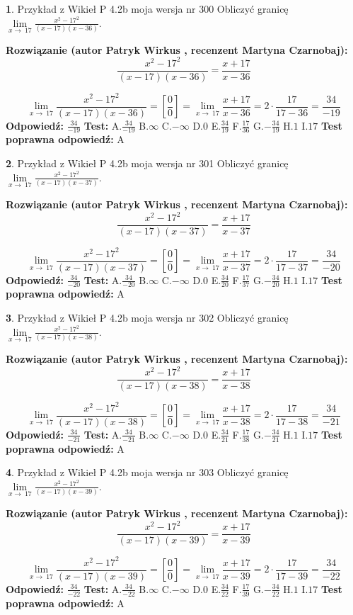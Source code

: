 \documentclass[12pt, a4paper]{article}
\theoremstyle{definition} %
\newtheorem{zad}{}
\newcommand{\zadStart}[1]{\begin{zad}#1\newline}
\newcommand{\zadStop}{\end{zad}}
\newcommand{\rozwStart}[2]{\noindent \textbf{Rozwiązanie (autor #1 , recenzent #2): }\newline}
\newcommand{\rozwStop}{\newline}
\newcommand{\odpStart}{\noindent \textbf{Odpowiedź:}\newline}
\newcommand{\odpStop}{\newline}
\newcommand{\testStart}{\noindent \textbf{Test:}\newline}
\newcommand{\testStop}{\newline}
\newcommand{\kluczStart}{\noindent \textbf{Test poprawna odpowiedź:}\newline}
\newcommand{\kluczStop}{\newline}
\begin{document}
\zadStart{Przykład z Wikieł P 4.2b moja wersja nr 300}
Obliczyć granicę $\lim\limits_{x\to\ 17}\frac{x^{2}-17^{2}}{(x-17)(x-36)}$.
\zadStop
\rozwStart{Patryk Wirkus}{Martyna Czarnobaj}
$$\frac{x^{2}-17^{2}}{(x-17)(x-36)}=\frac{x+17}{x-36}$$

$$\lim\limits_{x\to\ 17}\frac{x^{2}-17^{2}}{(x-17)(x-36)}=[\frac{0}{0}]=\lim\limits_{x\to\ 17}\frac{x+17}{x-36}=2 \cdot \frac{17}{17-36} = \frac{34}{-19}$$
\rozwStop
\odpStart
$\frac{34}{-19}$
\odpStop
\testStart
A.$\frac{34}{-19}$
B.$\infty$
C.$-\infty$
D.$0$
E.$\frac{34}{19}$
F.$\frac{17}{36}$
G.$-\frac{34}{19}$
H.$1$
I.$17$
\testStop
\kluczStart
A
\kluczStop



\zadStart{Przykład z Wikieł P 4.2b moja wersja nr 301}
Obliczyć granicę $\lim\limits_{x\to\ 17}\frac{x^{2}-17^{2}}{(x-17)(x-37)}$.
\zadStop
\rozwStart{Patryk Wirkus}{Martyna Czarnobaj}
$$\frac{x^{2}-17^{2}}{(x-17)(x-37)}=\frac{x+17}{x-37}$$

$$\lim\limits_{x\to\ 17}\frac{x^{2}-17^{2}}{(x-17)(x-37)}=[\frac{0}{0}]=\lim\limits_{x\to\ 17}\frac{x+17}{x-37}=2 \cdot \frac{17}{17-37} = \frac{34}{-20}$$
\rozwStop
\odpStart
$\frac{34}{-20}$
\odpStop
\testStart
A.$\frac{34}{-20}$
B.$\infty$
C.$-\infty$
D.$0$
E.$\frac{34}{20}$
F.$\frac{17}{37}$
G.$-\frac{34}{20}$
H.$1$
I.$17$
\testStop
\kluczStart
A
\kluczStop



\zadStart{Przykład z Wikieł P 4.2b moja wersja nr 302}
Obliczyć granicę $\lim\limits_{x\to\ 17}\frac{x^{2}-17^{2}}{(x-17)(x-38)}$.
\zadStop
\rozwStart{Patryk Wirkus}{Martyna Czarnobaj}
$$\frac{x^{2}-17^{2}}{(x-17)(x-38)}=\frac{x+17}{x-38}$$

$$\lim\limits_{x\to\ 17}\frac{x^{2}-17^{2}}{(x-17)(x-38)}=[\frac{0}{0}]=\lim\limits_{x\to\ 17}\frac{x+17}{x-38}=2 \cdot \frac{17}{17-38} = \frac{34}{-21}$$
\rozwStop
\odpStart
$\frac{34}{-21}$
\odpStop
\testStart
A.$\frac{34}{-21}$
B.$\infty$
C.$-\infty$
D.$0$
E.$\frac{34}{21}$
F.$\frac{17}{38}$
G.$-\frac{34}{21}$
H.$1$
I.$17$
\testStop
\kluczStart
A
\kluczStop



\zadStart{Przykład z Wikieł P 4.2b moja wersja nr 303}
Obliczyć granicę $\lim\limits_{x\to\ 17}\frac{x^{2}-17^{2}}{(x-17)(x-39)}$.
\zadStop
\rozwStart{Patryk Wirkus}{Martyna Czarnobaj}
$$\frac{x^{2}-17^{2}}{(x-17)(x-39)}=\frac{x+17}{x-39}$$

$$\lim\limits_{x\to\ 17}\frac{x^{2}-17^{2}}{(x-17)(x-39)}=[\frac{0}{0}]=\lim\limits_{x\to\ 17}\frac{x+17}{x-39}=2 \cdot \frac{17}{17-39} = \frac{34}{-22}$$
\rozwStop
\odpStart
$\frac{34}{-22}$
\odpStop
\testStart
A.$\frac{34}{-22}$
B.$\infty$
C.$-\infty$
D.$0$
E.$\frac{34}{22}$
F.$\frac{17}{39}$
G.$-\frac{34}{22}$
H.$1$
I.$17$
\testStop
\kluczStart
A
\kluczStop
\end{document}
